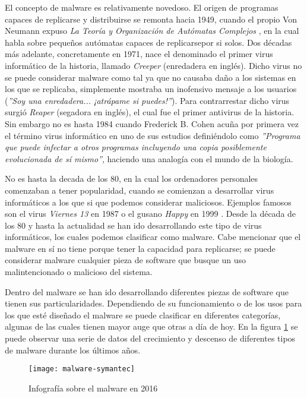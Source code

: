 El concepto de malware es relativamente novedoso. El origen de programas capaces de replicarse y distribuirse se remonta hacia 1949, cuando el propio Von Neumann expuso \emph{La Teoría y Organización de Autómatas Complejos} \cite{von-neumann}, en la cual habla sobre pequeños autómatas capaces de replicarsepor si solos. Dos décadas más adelante, concretamente en 1971, nace el denominado el primer virus informático de la historia, llamado \emph{Creeper} \cite{creeper} (enredadera en inglés).  Dicho virus no se puede considerar malware como tal ya que no causaba daño a los sistemas en los que se replicaba, simplemente mostraba un inofensivo mensaje a los usuarios (\textsl{''Soy una enredadera... ¡atrápame si puedes!''}). Para contrarrestar dicho virus surgió \emph{Reaper} (segadora en inglés), el cual fue el primer antivirus de la historia. Sin embargo no es hasta 1984 cuando Frederick B. Cohen acuña por primera vez el término virus informático en uno de sus estudios definiéndolo como \emph{''Programa que puede infectar a otros programas incluyendo una copia posiblemente evolucionada de sí mismo''}, haciendo una analogía con el mundo de la biología.

No es hasta la decada de los 80, en la cual los ordenadores personales comenzaban a tener popularidad, cuando se comienzan a desarrollar virus informáticos a los que si que podemos considerar maliciosos. Ejemplos famosos son el virus \emph{Viernes 13} en 1987 o el gusano \emph{Happy} en 1999 \cite{panda-virus-history}. Desde la década de los 80 y hasta la actualidad se han ido desarrollando este tipo de virus informáticos, los cuales podemos clasificar como malware. Cabe mencionar que el malware en sí no tiene porque tener la capacidad para replicarse; se puede considerar malware cualquier pieza de software que busque un uso malintencionado o malicioso del sistema.

Dentro del malware se han ido desarrollando diferentes piezas de software que tienen sus particularidades. Dependiendo de su funcionamiento o de los usos para los que esté diseñado el malware se puede clasificar en diferentes categorías, algunas de las cuales tienen mayor auge que otras a día de hoy. En la figura \ref{fig:malware-symantec} se puede observar una serie de datos del crecimiento y descenso de diferentes tipos de malware durante los últimos años.

\begin{figure}[H]
	\centering
	\texttt{[image: malware-symantec]}
	\caption{Infografía sobre el malware en 2016 \cite{malware-symantec}}
	\label{fig:malware-symantec}
\end{figure}

